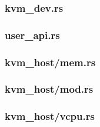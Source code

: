 \documentclass[code]{mancls}
\begin{document}
\subsubsection{kvm\_dev.rs}


\subsubsection{user\_api.rs}


\subsubsection{kvm\_host/mem.rs}


\subsubsection{kvm\_host/mod.rs}


\subsubsection{kvm\_host/vcpu.rs}

\end{document}

